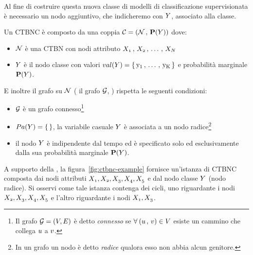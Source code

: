 Al fine di costruire questa nuova classe di modelli di classificazione supervisionata è necessario un nodo aggiuntivo, che indicheremo con $\mathnormal{Y}$, associato alla classe.
\begin{definizione}\label{defn:ctbnc}
Un \acf{CTBNC} è composto da una coppia $\mathcal{C}=(\mathcal{N}\,,\,\mathbf{P}(\mathnormal{Y}))$ dove:
\begin{itemize}
    \item $\mathcal{N}$ è una \acs{CTBN} con nodi attributo $\mathnormal{X_1}\,,\,\mathnormal{X_2}\,,\,\dotsc\,,\,\mathnormal{X_N}$
    \item $\mathnormal{Y}$ è il nodo classe con valori $val(\mathnormal{Y})=\{\,\mathrm{y_1}\,,\,\dotsc\,,\,\mathrm{y_K}\,\}$ e probabilità marginale $\mathbf{P}(\mathnormal{Y})$.
\end{itemize}
E inoltre il grafo su $\mathcal{N}$ (\ie{} il grafo $\mathcal{G}$, ) rispetta le seguenti condizioni:
\begin{itemize}
    \item $\mathcal{G}$ è un grafo connesso\footnote{Il grafo $\mathcal{G} = (\mathnormal{V}, \mathnormal{E})$ è detto \emph{connesso} se $\forall \: (\mathnormal{u}\,,\,\mathnormal{v}) \in \mathnormal{V}$ esiste un cammino che collega $\mathnormal{u}$ a $\mathnormal{v}$.}
    \item $Pa(\mathnormal{Y})=\{\,\}$, \ie{} la variabile casuale $\mathnormal{Y}$ è associata a un nodo radice\footnote{In un grafo un nodo è detto \emph{radice} qualora esso non abbia alcun genitore.}
    \item il nodo $\mathnormal{Y}$ è indipendente dal tempo ed è specificato solo ed esclusivamente dalla sua probabilità marginale $\mathbf{P}(\mathnormal{Y})$.
\end{itemize}
\end{definizione}
A supporto della , la figura~\vref{fig:ctbnc-example} fornisce un'istanza di \acs{CTBNC} composta dai nodi attributi $\mathnormal{X_1},\mathnormal{X_2},\mathnormal{X_3},\mathnormal{X_4},\mathnormal{X_5}$ e dal nodo classe $\mathnormal{Y}$ (nodo radice). Si osservi come tale istanza contenga dei cicli, uno riguardante i nodi $\mathnormal{X_2},\mathnormal{X_3},\mathnormal{X_4},\mathnormal{X_5}$ e l'altro riguardante i nodi $\mathnormal{X_1},\mathnormal{X_3}$.

